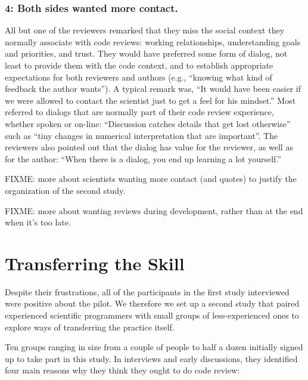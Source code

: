 \documentclass[10pt,twocolumn]{article}
\begin{document}
\subsubsection*{4: Both sides wanted more contact.}

All but one of the reviewers remarked that they miss the social context they normally associate with code reviews:
working relationships, understanding goals and priorities, and trust.
They would have preferred some form of dialog,
not least to provide them with the code context,
and to establish appropriate expectations for both reviewers and authors
(e.g., ``knowing what kind of feedback the author wants'').
A typical remark was, ``It would have been easier if we were allowed to contact the scientist just to get a feel for his mindset.''
Most referred to dialogs that are normally part of their code review experience,
whether spoken or on-line:
``Discussion catches details that get lost otherwise'' such as ``tiny changes in numerical interpretation that are important''.
The reviewers also pointed out that the dialog has value for the reviewer, as well as for the author:
``When there is a dialog, you end up learning a lot yourself.''

FIXME: more about scientists wanting more contact (and quotes) to justify the organization of the second study.

FIXME: more about wanting reviews during development, rather than at the end when it's too late.

\section{Transferring the Skill}

Despite their frustrations,
all of the participants in the first study interviewed were positive about the pilot.
We therefore we set up a second study that paired experienced scientific programmers
with small groups of less-experienced ones to explore ways of transferring the practice itself.

Ten groups ranging in size from a couple of people to half a dozen initially signed up to take part in this study.
In interviews and early discussions, they identified four main reasons why they think they ought to do code review:
\end{document}
